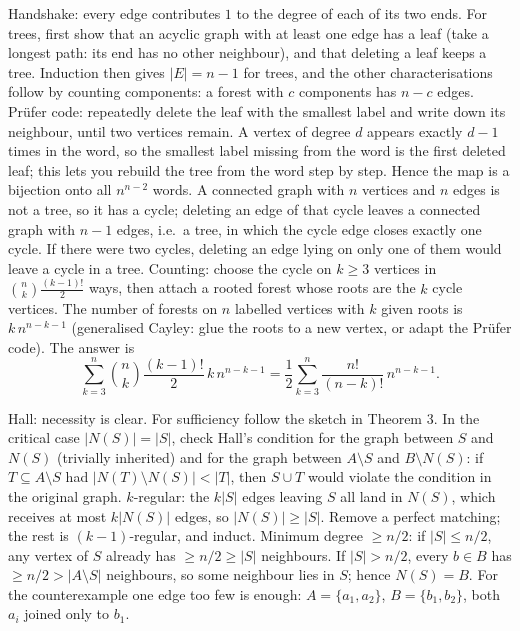\documentclass[11pt,a4paper]{article}
\begin{document}

Handshake: every edge contributes \(1\) to the degree of each of its two ends. For trees, first show that an acyclic graph with at least one edge has a leaf (take a longest path: its end has no other neighbour), and that deleting a leaf keeps a tree. Induction then gives \(|E|=n-1\) for trees, and the other characterisations follow by counting components: a forest with \(c\) components has \(n-c\) edges.
Prüfer code: repeatedly delete the leaf with the smallest label and write down its neighbour, until two vertices remain. A vertex of degree \(d\) appears exactly \(d-1\) times in the word, so the smallest label missing from the word is the first deleted leaf; this lets you rebuild the tree from the word step by step. Hence the map is a bijection onto all \(n^{n-2}\) words.
A connected graph with \(n\) vertices and \(n\) edges is not a tree, so it has a cycle; deleting an edge of that cycle leaves a connected graph with \(n-1\) edges, i.e.\ a tree, in which the cycle edge closes exactly one cycle. If there were two cycles, deleting an edge lying on only one of them would leave a cycle in a tree.
Counting: choose the cycle on \(k\ge3\) vertices in \(\binom nk\frac{(k-1)!}{2}\) ways, then attach a rooted forest whose roots are the \(k\) cycle vertices. The number of forests on \(n\) labelled vertices with \(k\) given roots is \(k\,n^{n-k-1}\) (generalised Cayley: glue the roots to a new vertex, or adapt the Prüfer code). The answer is
\[\sum_{k=3}^{n}\binom nk\frac{(k-1)!}{2}\,k\,n^{n-k-1}=\frac12\sum_{k=3}^{n}\frac{n!}{(n-k)!}\,n^{n-k-1}.\]

Hall: necessity is clear. For sufficiency follow the sketch in Theorem 3. In the critical case \(|N(S)|=|S|\), check Hall's condition for the graph between \(S\) and \(N(S)\) (trivially inherited) and for the graph between \(A\setminus S\) and \(B\setminus N(S)\): if \(T\subseteq A\setminus S\) had \(|N(T)\setminus N(S)|\lt|T|\), then \(S\cup T\) would violate the condition in the original graph.
\(k\)-regular: the \(k|S|\) edges leaving \(S\) all land in \(N(S)\), which receives at most \(k|N(S)|\) edges, so \(|N(S)|\ge|S|\). Remove a perfect matching; the rest is \((k-1)\)-regular, and induct.
Minimum degree \(\ge n/2\): if \(|S|\le n/2\), any vertex of \(S\) already has \(\ge n/2\ge|S|\) neighbours. If \(|S|\gt n/2\), every \(b\in B\) has \(\ge n/2\gt|A\setminus S|\) neighbours, so some neighbour lies in \(S\); hence \(N(S)=B\).
For the counterexample one edge too few is enough: \(A=\{a_1,a_2\}\), \(B=\{b_1,b_2\}\), both \(a_i\) joined only to \(b_1\).
\end{document}
